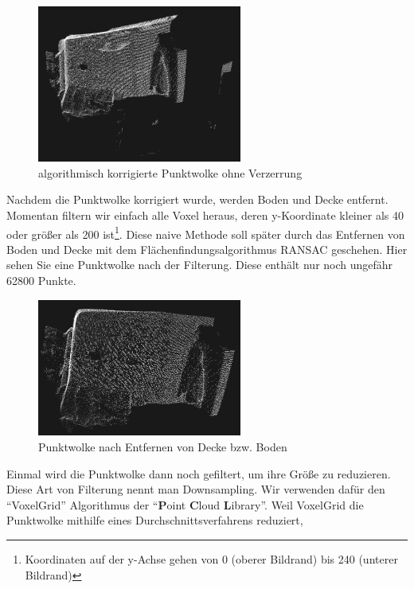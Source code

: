 \documentclass[a4paper,12pt,ngerman]{scrartcl}
\begin{document}
\begin{figure}[h]
	\centering
	\includegraphics[width=0.6\textwidth]{pointcloud_vor_filterung_76800_punkte}
	\caption{algorithmisch korrigierte Punktwolke ohne Verzerrung}
	\label{before_filtering}
\end{figure}
\par
Nachdem die Punktwolke korrigiert wurde, werden Boden und Decke entfernt. Momentan filtern
wir einfach alle Voxel heraus, deren y-Koordinate kleiner als 40 oder größer als 200 ist\footnote{Koordinaten auf der y-Achse gehen von 0 (oberer Bildrand) bis 240 (unterer Bildrand)}. Diese naive Methode soll später durch das Entfernen von Boden und Decke mit dem Flächenfindungsalgorithmus RANSAC geschehen. Hier sehen Sie eine Punktwolke nach der
Filterung. Diese enthält nur noch ungefähr 62800 Punkte.
\begin{figure}[h]
	\centering
	\includegraphics[width=0.6\textwidth]{pointcloud_nach_filterung_62800_punkte}
	\caption{Punktwolke nach Entfernen von Decke bzw. Boden}
	\label{after_filtering}
\end{figure}
\par
Einmal wird die Punktwolke dann noch gefiltert, um ihre Größe zu reduzieren. 
Diese Art von Filterung nennt man Downsampling. Wir verwenden dafür den \enquote{VoxelGrid} Algorithmus der \enquote{\textbf{P}oint \textbf{C}loud \textbf{L}ibrary}.
Weil VoxelGrid die Punktwolke mithilfe eines Durchschnittsverfahrens reduziert, 
\end{document}
